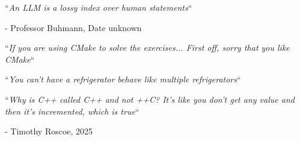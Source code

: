 \newpage
\hspace{1cm}
\begin{center}
    \begin{Huge}
    \end{Huge}

    \begin{Large}
        ``\textit{An LLM is a lossy index over human statements}``
    \end{Large}

    \hspace{3cm} - Professor Buhmann, Date unknown

    \begin{Large}
        ``\textit{If you are using CMake to solve the exercises... First off, sorry that you like CMake}``

        ``\textit{You can't have a refrigerator behave like multiple refrigerators}`` %

        ``\textit{Why is C++ called C++ and not ++C? It's like you don't get any value and then it's incremented, which is true}`` %
    \end{Large}

    \hspace{3cm} - Timothy Roscoe, 2025
\end{center}
